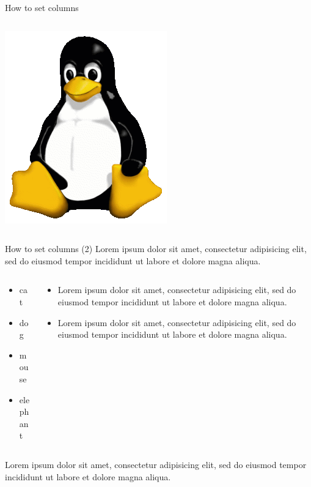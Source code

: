 \documentclass[]{beamer}
\begin{document}
\begin{frame}{How to set columns}
\begin{columns}[T]
\begin{column}{.45\textwidth}
      \includegraphics[width=.9\textwidth]{pictures/Tux}
    \end{column}
  \end{columns}
\end{frame}


\begin{frame}{How to set columns (2)}
  Lorem ipsum dolor sit amet, consectetur adipisicing elit, sed do eiusmod tempor incididunt ut labore et dolore magna aliqua. 
  \begin{columns}[t]
    \begin{column}{.4\textwidth}
      \begin{itemize}
        \item cat
        \item dog
        \item mouse
        \item elephant
      \end{itemize}
    \end{column}
    \begin{column}{.6\textwidth}
      \begin{itemize}
        \item Lorem ipsum dolor sit amet, consectetur adipisicing elit, sed do eiusmod tempor incididunt ut labore et dolore magna aliqua. 
        \item Lorem ipsum dolor sit amet, consectetur adipisicing elit, sed do eiusmod tempor incididunt ut labore et dolore magna aliqua. 
      \end{itemize}
    \end{column}
  \end{columns}

  Lorem ipsum dolor sit amet, consectetur adipisicing elit, sed do eiusmod tempor incididunt ut labore et dolore magna aliqua. 
\end{frame}
\end{document}
